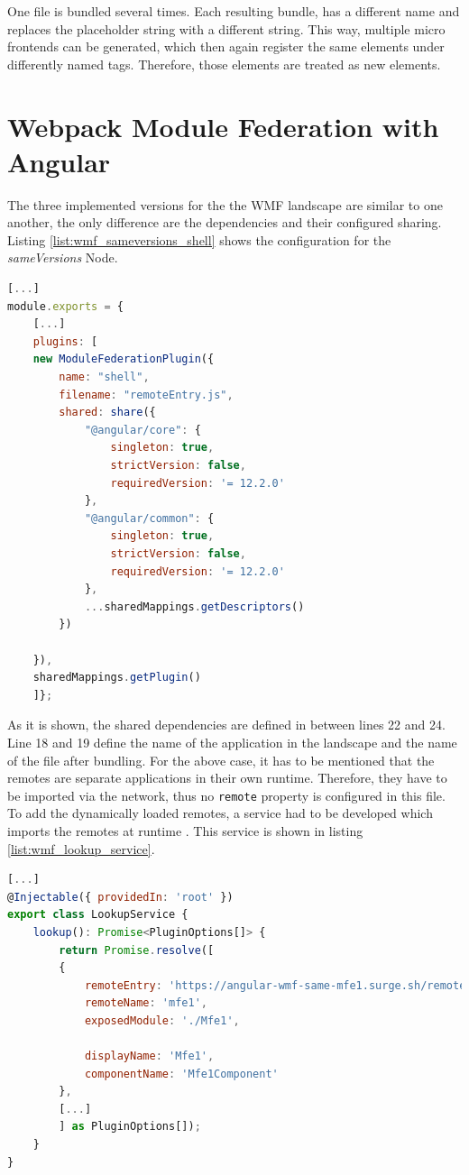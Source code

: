 One file is bundled several times. Each resulting bundle, has a different name and replaces the placeholder string with a different string. This way, multiple micro frontends can be generated, which then again register the same elements under differently named tags. Therefore, those elements are treated as new elements.

\section{Webpack Module Federation with Angular} 
\label{wmf_implementation_prototype}

The three implemented versions for the the WMF landscape are similar to one another, the only difference are the dependencies and their configured sharing. Listing \ref{list:wmf_sameversions_shell} shows the configuration for the \textit{sameVersions} Node.

\begin{lstlisting}[language=JavaScript, caption=Content of \texttt{webpack.config.js} of the shell of the sameVersions WMF project, label=list:wmf_sameversions_shell, xleftmargin=.0\textwidth, xrightmargin=.0\textwidth]
[...]
module.exports = {
	[...]
	plugins: [
	new ModuleFederationPlugin({
		name: "shell",
		filename: "remoteEntry.js",
		shared: share({
			"@angular/core": { 
				singleton: true, 
				strictVersion: false, 
				requiredVersion: '= 12.2.0'
			},
			"@angular/common": { 
				singleton: true, 
				strictVersion: false, 
				requiredVersion: '= 12.2.0' 
			},
			...sharedMappings.getDescriptors()
		})
		
	}),
	sharedMappings.getPlugin()
	]};
\end{lstlisting}

As it is shown, the shared dependencies are defined in between lines 22 and 24. Line 18 and 19 define the name of the application in the landscape and the name of the file after bundling. For the above case, it has to be mentioned that the remotes are separate applications in their own runtime. Therefore, they have to be imported via the network, thus no \texttt{remote} property is configured in this file. To add the dynamically loaded remotes, a service had to be developed which imports the remotes at runtime \cite{wmf_angular_dynamicfederation}. This service is shown in listing \ref{list:wmf_lookup_service}.

\newpage

\begin{lstlisting}[language=JavaScript, caption=Content of \texttt{lookup.service.ts} for remote module loading in shell applications, label=list:wmf_lookup_service,  xleftmargin=.0\textwidth, xrightmargin=.0\textwidth]
[...]
@Injectable({ providedIn: 'root' })
export class LookupService {
	lookup(): Promise<PluginOptions[]> {
		return Promise.resolve([
		{
			remoteEntry: 'https://angular-wmf-same-mfe1.surge.sh/remoteEntry.js',
			remoteName: 'mfe1',
			exposedModule: './Mfe1',
			
			displayName: 'Mfe1',
			componentName: 'Mfe1Component'
		},
		[...]	
		] as PluginOptions[]);
	}
}
\end{lstlisting}

